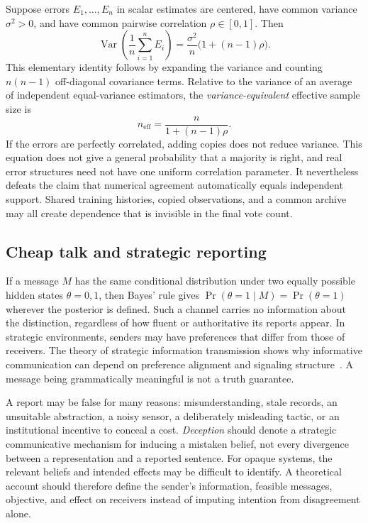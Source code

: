 Suppose errors $E_1,\ldots,E_n$ in scalar estimates are centered, have common variance $\sigma^2>0$, and have common pairwise correlation $\rho\in[0,1]$. Then
\begin{equation}\label{MS:eq:correlated}
\operatorname{Var}\left(\frac1n\sum_{i=1}^n E_i\right)
=\frac{\sigma^2}{n}\bigl(1+(n-1)\rho\bigr).
\end{equation}
This elementary identity follows by expanding the variance and counting $n(n-1)$ off-diagonal covariance terms. Relative to the variance of an average of independent equal-variance estimators, the \emph{variance-equivalent} effective sample size is
\[
n_{\mathrm{eff}}=\frac{n}{1+(n-1)\rho}.
\]
If the errors are perfectly correlated, adding copies does not reduce variance. This equation does not give a general probability that a majority is right, and real error structures need not have one uniform correlation parameter. It nevertheless defeats the claim that numerical agreement automatically equals independent support. Shared training histories, copied observations, and a common archive may all create dependence that is invisible in the final vote count.

\subsection{Cheap talk and strategic reporting}

If a message $M$ has the same conditional distribution under two equally possible hidden states $\theta=0,1$, then Bayes' rule gives $\Pr(\theta=1\mid M)=\Pr(\theta=1)$ wherever the posterior is defined. Such a channel carries no information about the distinction, regardless of how fluent or authoritative its reports appear. In strategic environments, senders may have preferences that differ from those of receivers. The theory of strategic information transmission shows why informative communication can depend on preference alignment and signaling structure~\cite{MS:crawfordsobel}. A message being grammatically meaningful is not a truth guarantee.

A report may be false for many reasons: misunderstanding, stale records, an unsuitable abstraction, a noisy sensor, a deliberately misleading tactic, or an institutional incentive to conceal a cost. \emph{Deception} should denote a strategic communicative mechanism for inducing a mistaken belief, not every divergence between a representation and a reported sentence. For opaque systems, the relevant beliefs and intended effects may be difficult to identify. A theoretical account should therefore define the sender's information, feasible messages, objective, and effect on receivers instead of imputing intention from disagreement alone.

